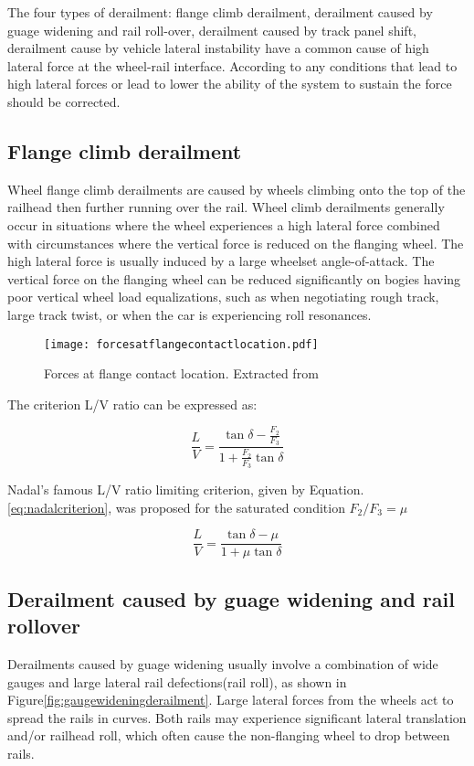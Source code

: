 The four types of derailment: flange climb derailment, derailment caused by guage widening and rail roll-over, derailment caused by track panel shift, derailment cause by vehicle lateral instability have a common cause of high lateral force at the wheel-rail interface. According to \citet[Chapter 8, IV]{iwnicki2006handbook} any conditions that lead to high lateral forces or lead to lower the ability of the system to sustain the force should be corrected. 

\subsection{Flange climb derailment}
Wheel flange climb derailments are caused by wheels climbing onto the top of the railhead then further running over the rail. Wheel climb derailments generally occur in situations where the wheel experiences a high lateral force combined with circumstances where the vertical force is reduced on the flanging wheel. The high lateral force is usually induced by a large wheelset angle-of-attack. The vertical force on the flanging wheel can be reduced significantly on bogies having poor vertical wheel load equalizations, such as when negotiating rough track, large track twist, or when the car is experiencing roll resonances. 

\begin{figure}[h]
    \centering
    \texttt{[image: forcesatflangecontactlocation.pdf]}
    \caption{Forces at flange contact location. Extracted from \citet[Figure8.4]{iwnicki2006handbook}}
    \label{fig:forcesatflangecontactlocation}
\end{figure}

The criterion L/V ratio can be expressed as:

\begin{equation}
    \frac{L}{V}=\frac{\tan \delta -\frac{F_2}{F_3}}{1+\frac{F_2}{F_3}\tan \delta}
\end{equation}

Nadal's famous L/V ratio limiting criterion, given by Equation.\ref{eq:nadalcriterion}, was proposed for the saturated condition $F_2/F_3=\mu$

\begin{equation}\label{eq:nadalcriterion}
    \frac{L}{V}=\frac{\tan \delta - \mu}{1+ \mu \tan \delta}
\end{equation}

\subsection{Derailment caused by guage widening and rail rollover}
Derailments caused by guage widening usually involve a combination of wide gauges and large lateral rail defections(rail roll), as shown in Figure\ref{fig:gaugewideningderailment}. Large lateral forces from the wheels act to spread the rails in curves. Both rails may experience significant lateral translation and/or railhead roll, which often cause the non-flanging wheel to drop between rails.

